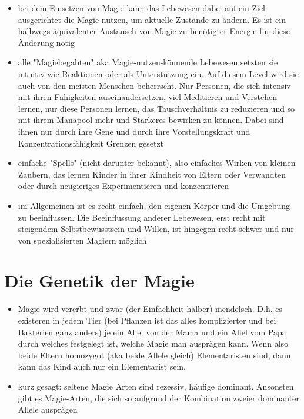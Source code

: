 \begin{itemize}
	\item bei dem Einsetzen von Magie kann das Lebewesen dabei auf ein Ziel ausgerichtet die Magie nutzen, um aktuelle Zustände zu ändern. Es ist ein halbwegs äquivalenter Austausch von Magie zu benötigter Energie für diese Änderung nötig
	\item alle "Magiebegabten" aka Magie-nutzen-könnende Lebewesen setzten sie intuitiv wie Reaktionen oder als Unterstützung ein. Auf diesem Level wird sie auch von den meisten Menschen beherrscht. Nur Personen, die sich intensiv mit ihren Fähigkeiten auseinandersetzen, viel Meditieren und Verstehen lernen, nur diese Personen lernen, das Tauschverhältnis zu reduzieren und so mit ihrem Manapool mehr und Stärkeres bewirken zu können. Dabei sind ihnen nur durch ihre Gene und durch ihre Vorstellungskraft und Konzentrationsfähigkeit Grenzen gesetzt
	\item einfache "Spells" (nicht darunter bekannt), also einfaches Wirken  von kleinen Zaubern, das lernen Kinder in ihrer Kindheit von Eltern oder Verwandten oder durch neugieriges Experimentieren und konzentrieren
	\item im Allgemeinen ist es recht einfach, den eigenen Körper und die Umgebung zu beeinflussen. Die Beeinflussung anderer Lebewesen, erst recht mit steigendem Selbstbewusstsein und Willen, ist hingegen recht schwer und nur von spezialisierten Magiern möglich
\end{itemize}


\section{Die Genetik der Magie}
\begin{itemize}
	\item Magie wird vererbt und zwar (der Einfachheit halber) mendelsch. D.h. es existeren in jedem Tier (bei Pflanzen ist das alles komplizierter und bei Bakterien ganz anders) je ein Allel von der Mama und ein Allel vom Papa durch welches festgelegt ist, welche Magie man ausprägen kann. Wenn also beide Eltern homozygot (aka beide Allele gleich) Elementaristen sind, dann kann das Kind auch nur ein Elementarist sein.
	\item kurz gesagt: seltene Magie Arten sind rezessiv, häufige dominant. Ansonsten gibt es Magie-Arten, die sich so aufgrund der Kombination zweier dominanter Allele ausprägen
\end{itemize}
